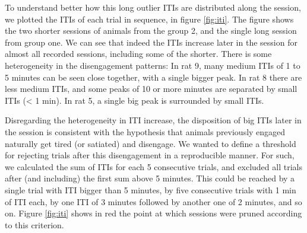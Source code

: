     
    To understand better how this long outlier ITIs are distributed along the session, we plotted the ITIs of each trial in sequence, in figure \ref{fig:iti}. The figure shows the two shorter sessions of animals from the group 2, and the single long session from group one. We can see that indeed the ITIs increase later in the session for almost all recorded sessions, including some of the shorter. There is some heterogeneity in the disengagement patterns: In rat 9, many medium ITIs of 1 to 5 minutes can be seen close together, with a single bigger peak. In rat 8 there are less medium ITIs, and some peaks of 10 or more minutes are separated by small ITIs (< 1 min). In rat 5, a single big peak is surrounded by small ITIs.
    
    Disregarding the heterogeneity in ITI increase, the disposition of big ITIs later in the session is consistent with the hypothesis that animals previously engaged naturally get tired (or satiated) and disengage. We wanted to define a threshold for rejecting trials after this disengagement in a reproducible manner. For such, we calculated the sum of ITIs for each 5 consecutive trials, and excluded all trials after (and including) the first sum above 5 minutes. This could be reached by a single trial with ITI bigger than 5 minutes, by five consecutive trials with 1 min of ITI each, by one ITI of 3 minutes followed by another one of 2 minutes, and so on. Figure \ref{fig:iti} shows in red the point at which sessions were pruned according to this criterion.
    
